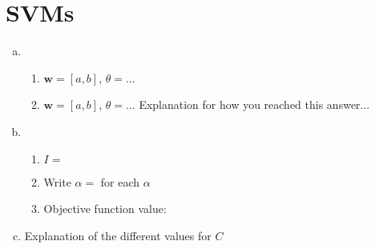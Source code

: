 \documentclass{article}
\begin{document}
\section*{SVMs}
\begin{enumerate}[(a)]
    \item \begin{enumerate}[1.]
        \item $\mathbf{w} = [a, b]$, $\theta = ...$
        \item $\mathbf{w} = [a, b]$, $\theta = ...$
        Explanation for how you reached this answer...
    \end{enumerate}
    \item \begin{enumerate}[1.]
        \item $I = $
        \item Write $\alpha = $ for each $\alpha$
        \item Objective function value:
    \end{enumerate}
    \item Explanation of the different values for $C$
\end{enumerate}
\end{document}
